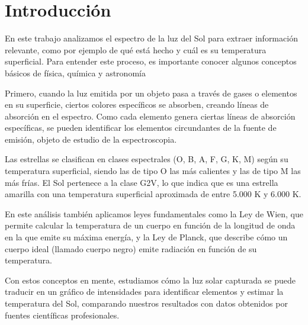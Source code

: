 \documentclass[11pt, a4paper]{article}
\begin{document}
\newpage
\section{Introducción}
En este trabajo analizamos el espectro de la luz del Sol para extraer información relevante, como por ejemplo de qué está hecho y cuál es su temperatura superficial. Para entender este proceso, es importante conocer algunos conceptos básicos de física, química y astronomía 

Primero, cuando la luz emitida por un objeto pasa a través de gases o elementos en su superficie, ciertos colores específicos se absorben, creando líneas de absorción en el espectro. Como cada elemento genera ciertas líneas de absorción específicas, se pueden identificar los elementos circundantes de la fuente de emisión, objeto de estudio de la espectroscopia.

Las estrellas se clasifican en clases espectrales (O, B, A, F, G, K, M) según su temperatura superficial, siendo las de tipo O las más calientes y las de tipo M las más frías. El Sol pertenece a la clase G2V, lo que indica que es una estrella amarilla con una temperatura superficial aproximada de entre 5.000 K y $6.000$ K.  

En este análisis también aplicamos leyes fundamentales como la Ley de Wien, que permite calcular la temperatura de un cuerpo en función de la longitud de onda en la que emite su máxima energía, y la Ley de Planck, que describe cómo un cuerpo ideal (llamado cuerpo negro) emite radiación en función de su temperatura.  

Con estos conceptos en mente, estudiamos cómo la luz solar capturada se puede traducir en un gráfico de intensidades para identificar elementos y estimar la temperatura del Sol, comparando nuestros resultados con datos obtenidos por fuentes científicas profesionales. 

\end{document}
